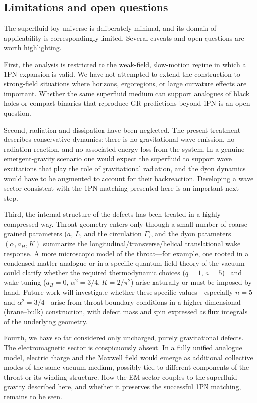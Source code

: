 \documentclass[11pt]{article}
\begin{document}
\subsection{Limitations and open questions}
\label{subsec:discussion-limitations}

The superfluid toy universe is deliberately minimal, and its domain
of applicability is correspondingly limited.
Several caveats and open questions are worth highlighting.

First, the analysis is restricted to the weak-field, slow-motion
regime in which a 1PN expansion is valid.
We have not attempted to extend the construction to strong-field
situations where horizons, ergoregions, or large curvature effects
are important.
Whether the same superfluid medium can support analogues of black
holes or compact binaries that reproduce GR predictions beyond 1PN is
an open question.

Second, radiation and dissipation have been neglected.
The present treatment describes conservative dynamics: there is no
gravitational-wave emission, no radiation reaction, and no associated
energy loss from the system.
In a genuine emergent-gravity scenario one would expect the
superfluid to support wave excitations that play the role of
gravitational radiation, and the dyon dynamics would have to be
augmented to account for their backreaction.
Developing a wave sector consistent with the 1PN matching presented
here is an important next step.

Third, the internal structure of the defects has been treated in a
highly compressed way.
Throat geometry enters only through a small number of coarse-grained
parameters ($a$, $L$, and the circulation $\Gamma$), and the dyon
parameters $(\alpha,a_H,K)$ summarize the longitudinal/transverse/helical
translational wake response.
A more microscopic model of the throat---for example, one rooted in a
condensed-matter analogue or in a specific quantum field theory of
the vacuum---could clarify whether the required thermodynamic choices
($q=1$, $n=5$)~\cite{Norris:2025Orbits,Norris:Paper2} and wake tuning
($a_H=0$, $\alpha^2=3/4$, $K=2/\pi^2$) arise naturally or must be imposed by
hand.
Future work will investigate whether these specific values---especially $n=5$ and $\alpha^2=3/4$---arise from throat boundary conditions in a higher-dimensional (brane--bulk) construction, with defect mass and spin expressed as flux integrals of the underlying geometry.

Fourth, we have so far considered only uncharged, purely gravitational
defects.
The electromagnetic sector is conspicuously absent.
In a fully unified analogue model, electric charge and the Maxwell
field would emerge as additional collective modes of the same vacuum
medium, possibly tied to different components of the throat or its
winding structure.
How the EM sector couples to the superfluid gravity described here,
and whether it preserves the successful 1PN matching, remains to be
seen.
\end{document}

